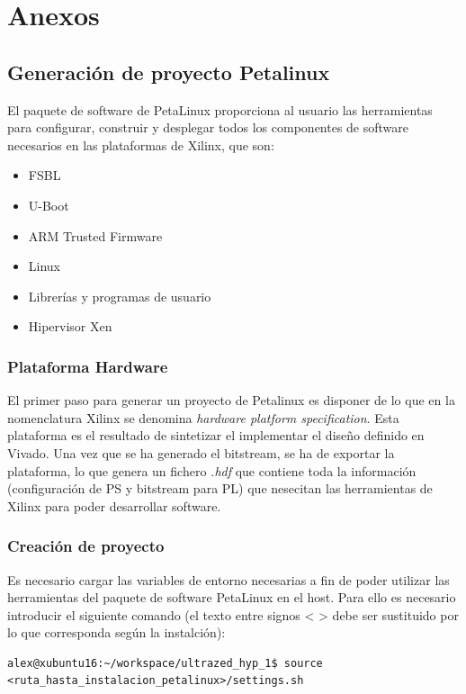 \chapter{Anexos}

\section{Generación de proyecto Petalinux} \label{petalinux}

El paquete de software de PetaLinux proporciona al usuario las herramientas para configurar, construir y desplegar todos los componentes de software necesarios en las plataformas de Xilinx, que son:
\begin{itemize}
  \item \acrshort{FSBL}
  \item U-Boot
  \item ARM Trusted Firmware
  \item Linux
  \item Librerías y programas de usuario
  \item Hipervisor Xen
\end{itemize}


\subsection{Plataforma Hardware}
El primer paso para generar un proyecto de Petalinux es disponer de lo que en la nomenclatura Xilinx se denomina \textit{hardware platform specification}. Esta plataforma es el resultado de sintetizar el implementar el diseño definido en Vivado. Una vez que se ha generado el bitstream, se ha de exportar la plataforma, lo que genera un fichero \textit{.hdf} que contiene toda la información (configuración de \acrshort{PS} y bitstream para \acrshort{PL}) que nesecitan las herramientas de Xilinx para poder desarrollar software.

\subsection{Creación de proyecto}
Es necesario cargar las variables de entorno necesarias a fin de poder utilizar las herramientas del paquete de software PetaLinux en el host. Para ello es necesario introducir el siguiente comando (el texto entre signos < > debe ser sustituido por lo que corresponda según la instalción):\\

\begin{lstlisting}[style=CStyle]
alex@xubuntu16:~/workspace/ultrazed_hyp_1$ source <ruta_hasta_instalacion_petalinux>/settings.sh
\end{lstlisting}

